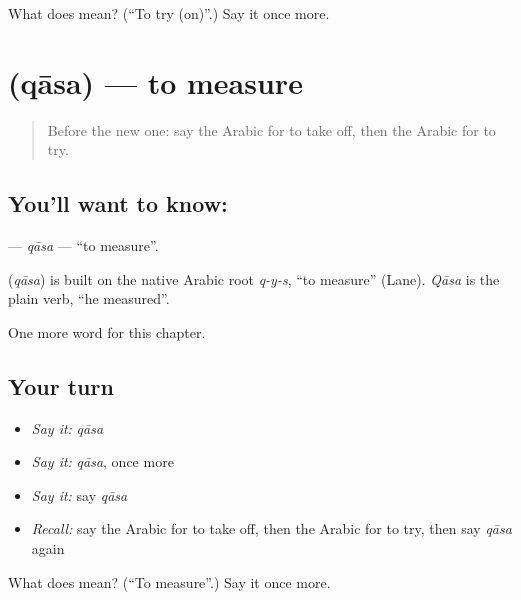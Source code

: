 \begin{tcolorbox}[breakable,colback=teal!4,colframe=teal!35!black,title={Before you move on}]
What does  mean? (\textquotedblleft{}To try (on)\textquotedblright{}.) Say it once more.
\end{tcolorbox}
\section[\texorpdfstring{\ar{قاس} (qāsa)}{قاس (qāsa)}]{ (qāsa) — to measure}

\label{lesson:AR-C193-qasa}



\begin{quote}
Before the new one: say the Arabic for to take off, then the Arabic for to try.
\end{quote}

\subsection*{You'll want to know: }
\textbf{} — \emph{qāsa} — \textquotedblleft{}to measure\textquotedblright{}.

\begin{cousinweb}
\textbf{} (\emph{qāsa}) is built on the native Arabic root \emph{q-y-s}, \textquotedblleft{}to measure\textquotedblright{} (Lane). \emph{Qāsa} is the plain verb, \textquotedblleft{}he measured\textquotedblright{}.
\end{cousinweb}

\begin{grammarlens}[title={What you've built}]
One more word for this chapter.
\end{grammarlens}

\subsection*{Your turn}
\begin{itemize}
\raggedright
  \item \emph{Say it:} \emph{qāsa}
  \item \emph{Say it:} \emph{qāsa}, once more
  \item \emph{Say it:} say \emph{qāsa}
  \item \emph{Recall:} say the Arabic for to take off, then the Arabic for to try, then say \emph{qāsa} again
\end{itemize}

\begin{tcolorbox}[breakable,colback=teal!4,colframe=teal!35!black,title={Before you move on}]
What does  mean? (\textquotedblleft{}To measure\textquotedblright{}.) Say it once more.
\end{tcolorbox}
